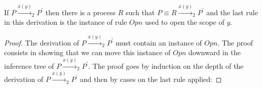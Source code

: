 \begin{lemma}\label{OpenClose}
  If $P \xrightarrow{\overline{x}(y)}_{2} P^{'}$ then there is a process $R$ such that $P \equiv R \xrightarrow{\overline{x}(y)}_{2} P^{'}$ and the last rule in this derivation is the instance of rule $Opn$ used to open the scope of $y$.
  \begin{proof}
    The derivation of $P \xrightarrow{\overline{x}(y)}_{2} P^{'}$ must contain an instance of $Opn$. The proof consists in showing that we can move this instance of $Opn$ downward in the inference tree of $P \xrightarrow{\overline{x}(y)}_{2} P^{'}$. The proof goes by induction on the depth of the derivation of $P \xrightarrow{\overline{x}(y)}_{2} P^{'}$ and then by cases on the last rule applied:
\end{proof}
\end{lemma}
